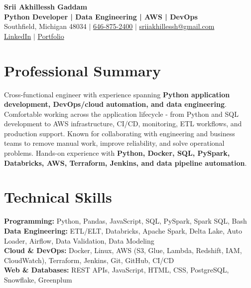 \documentclass[letterpaper,10pt]{article}
\begin{document}
\fontsize{9.35pt}{10.45pt}\selectfont

\begin{center}
    {\LARGE \textbf{Srii Akhillessh Gaddam}} \\[-1pt]
    \textbf{Python Developer | Data Engineering | AWS | DevOps} \\[2pt]
    Southfield, Michigan 48034 $|$
    \href{tel:6468752400}{646-875-2400} $|$
    \href{mailto:sriiakhillessh@gmail.com}{sriiakhillessh@gmail.com} \\[1pt]
    \href{https://www.linkedin.com/in/srii-akhiilessh-gaddam-b48668191/}{LinkedIn} $|$
    \href{https://sriiakhillesshg.github.io/portfolio/}{Portfolio}
\end{center}
\vspace{-8pt}

\section{Professional Summary}
\small{Cross-functional engineer with experience spanning \textbf{Python application development, DevOps/cloud automation, and data engineering}. Comfortable working across the application lifecycle - from Python and SQL development to AWS infrastructure, CI/CD, monitoring, ETL workflows, and production support. Known for collaborating with engineering and business teams to remove manual work, improve reliability, and solve operational problems. Hands-on experience with \textbf{Python, Docker, SQL, PySpark, Databricks, AWS, Terraform, Jenkins, and data pipeline automation}.}

\section{Technical Skills}
\small{
\textbf{Programming:} Python, Pandas, JavaScript, SQL, PySpark, Spark SQL, Bash \\
\textbf{Data Engineering:} ETL/ELT, Databricks, Apache Spark, Delta Lake, Auto Loader, Airflow, Data Validation, Data Modeling \\
\textbf{Cloud \& DevOps:} Docker, Linux, AWS (S3, Glue, Lambda, Redshift, IAM, CloudWatch), Terraform, Jenkins, Git, GitHub, CI/CD \\
\textbf{Web \& Databases:} REST APIs, JavaScript, HTML, CSS, PostgreSQL, Snowflake, Greenplum
}
\end{document}
